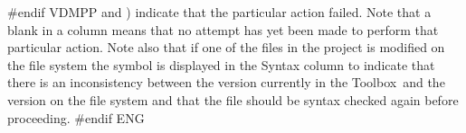 \documentclass[\pformat,12pt]{article}
\newcommand{\Toolbox}{Toolbox}
\newcommand{\Toolbox}{Toolbox}
\newcommand{\guicmd}[1]{{\sf #1}}
\newcommand{\guicmd}[1]{{\gt #1}}
\begin{document}
#endif VDMPP
and
)
indicate that the particular action failed. Note that a blank in a
column means that no attempt has yet been made to perform that
particular action. Note also that if one of the files in the project
is modified on the file system the symbol
is displayed in the \guicmd{Syntax} column  to indicate
that there is an inconsistency between the version currently in the \Toolbox\ and the
version on the file system and that the file should be syntax checked
again before proceeding.
#endif ENG
\end{document}
